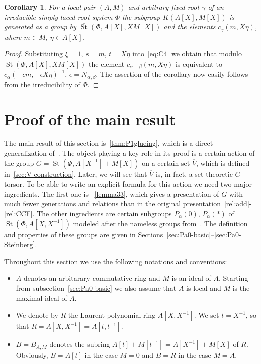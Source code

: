 \documentclass[oneside, 8pt]{amsart}
\newtheorem{corollary}[lemma]{Corollary}
\theoremstyle{remark}
\theoremstyle{definition}
\numberwithin{lemma}{section}
\numberwithin{prop}{section}
\numberwithin{corollary}{section}
\numberwithin{externaltheorem}{section}
\DeclareMathOperator{\St}{St}
\newcommand{\inv}{^{-1}}
\numberwithin{equation}{section}
\begin{document}
\begin{corollary} \label{Kgen-strong} For a local pair $(A, M)$ and arbitrary fixed root $\gamma$ of an irreducible simply-laced root system $\Phi$ the subgroup $K(A[X], M[X])$ is generated as a group by $\overline{\St}(\Phi, A[X], XM[X])$ and the elements $c_{\gamma}(m, X\eta)$, where $m \in M$, $\eta \in A[X]$. \end{corollary}
\begin{proof} Substituting $\xi = 1$, $s = m$, $t = X\eta$ into~\eqref{eq:C4} we obtain that modulo 
 $\overline{\St}(\Phi, A[X], XM[X])$ the element $c_{\alpha + \beta}(m, X\eta)$ is equivalent to $c_{\alpha}(-\epsilon m, -\epsilon X \eta)^{-1}$, $\epsilon = N_{\alpha, \beta}$. The assertion of the corollary now easily follows from the irreducibility of $\Phi$. \end{proof}   

\section{Proof of the main result}
The main result of this section is~\cref{thm:P1glueing}, which is a direct generalization of~\cite[Proposition~4.3]{Tu83}. 
The object playing a key role in its proof is a certain action of the group $G = \St(\Phi, A[X\inv] + M[X])$ on a certain set $\overline{V}$, which is defined in~\cref{sec:V-construction}. Later, we will see that $\overline{V}$ is, in fact, a set-theoretic $G$-torsor.
To be able to write an explicit formula for this action we need two major ingredients. The first one is ~\cref{lemma33}, which gives a presentation of $G$ with much fewer generations and relations than in the original presentation~\eqref{rel:add}-\eqref{rel:CCF}. The other ingredients are certain subgroups $P_\alpha(0)$, $P_\alpha(*)$ of $\St(\Phi, A[X, X\inv])$ modeled after the nameless groups from~\cite[Lemma~3.4]{Tu83}. The definition and properties of these groups are given in Sections~\ref{sec:Pa0-basic}--\ref{sec:Pa0-Steinberg}.

Throughout this section we use the following notations and conventions:
\begin{itemize}
 \item $A$ denotes an arbitarary commutative ring and $M$ is an ideal of $A$. Starting from subsection~\ref{sec:Pa0-basic} we also assume that $A$ is local and $M$ is the maximal ideal of $A$.
 \item We denote by $R$ the Laurent polynomial ring $A[X, X^{-1}]$. We set $t = X^{-1}$, so that $R = A[X, X^{-1}] = A[t, t^{-1}]$.
 \item $B = B_{A, M}$ denotes the subring $A[t] + M[t^{-1}] = A[X^{-1}] + M[X]$ of $R$. Obviously, $B = A[t]$ in the case $M=0$ and $B = R$ in the case $M=A$.
 \end{itemize}
\end{document}
